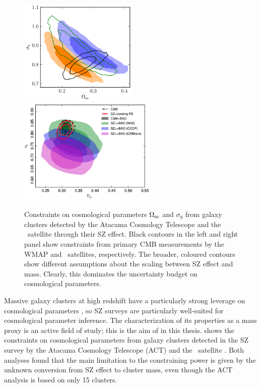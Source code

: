 \begin{figure}
 \centerline{\includegraphics[height=2in]{chapter1/cosmo_SZ_ACT.png}
             \includegraphics[height=2in]{chapter1/cosmo_SZ_Planck.png}}
\caption{Constraints on cosmological parameters $\Omega_{\rm m}$ and $\sigma_8$ from galaxy clusters detected by the Atacama Cosmology Telescope \citep[left, from][]{hasselfield13} and the \planck\ satellite \citep[right, from][]{planck15xxiv} through their SZ effect. Black contours in the left and right panel show constraints from primary CMB measurements by the WMAP and \planck\ satellites, respectively. The broader, coloured contours show different assumptions about the scaling between SZ effect and mass. Clearly, this dominates the uncertainty budget on cosmological parameters.}
\label{f:intro_szcosmo}
\end{figure}

Massive galaxy clusters at high redshift have a particularly strong leverage on cosmological parameters \citep{vikhlinin09}, so SZ surveys are particularly well-suited for cosmological parameter inference. The characterization of its properties as a mass proxy is an active field of study; this is the aim of  in this thesis.
%
 shows the constraints on cosmological parameters from galaxy clusters detected in the SZ survey by the Atacama Cosmology Telescope (ACT) \citep{hasselfield13} and the \planck\ satellite \citep{planck15xxiv}. Both analyses found that the main limitation to the constraining power is given by the unknown conversion from SZ effect to cluster mass, even though the ACT analysis is based on only 15 clusters.


